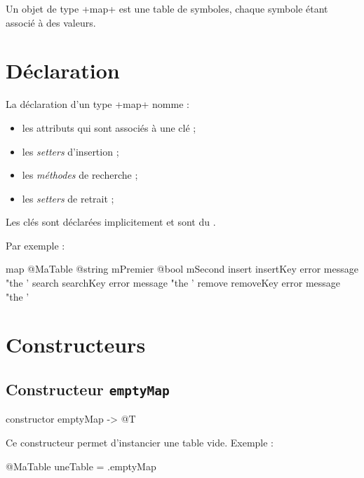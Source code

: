 

Un objet de type \ggs+map+ est une table de symboles, chaque symbole étant associé à des valeurs.

\section{Déclaration}

La déclaration d'un type \ggs+map+ nomme :
\begin{itemize}
  \item les attributs qui sont associés à une clé ;
  \item les \emph{setters} d'insertion ;
  \item les \emph{méthodes} de recherche ;
  \item les \emph{setters} de retrait ;
\end{itemize}

Les clés sont déclarées implicitement et sont du .

Par exemple :

\begin{galgas}
map @MaTable {
  @string mPremier
  @bool mSecond
  insert insertKey error message "the '%
  search searchKey error message "the '%
  remove removeKey error message "the '%
}
\end{galgas}







\section{Constructeurs}

\subsection{Constructeur \texttt{emptyMap}}

\begin{galgas}
constructor emptyMap -> @T
\end{galgas}

Ce constructeur permet d'instancier une table vide. Exemple :
\begin{galgas}
@MaTable uneTable = .emptyMap
\end{galgas}

